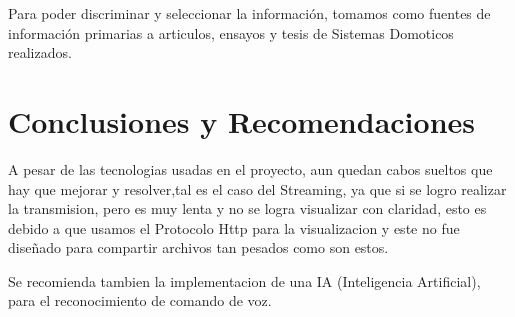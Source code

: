 \documentclass[letterpaper,12pt]{article}
\begin{document}
{Para poder discriminar y seleccionar la información, tomamos como fuentes de información primarias a articulos, ensayos y tesis de Sistemas Domoticos realizados.


\section{Conclusiones y Recomendaciones}
A pesar de las tecnologias usadas en el proyecto, aun quedan cabos sueltos que hay que mejorar y resolver,tal es el caso del Streaming, ya que si se logro realizar la transmision, pero es muy lenta y no se logra visualizar con claridad, esto es debido a que usamos el Protocolo Http para la visualizacion y este no fue diseñado para compartir archivos tan pesados como son estos.

Se recomienda tambien la implementacion de una IA (Inteligencia Artificial), para el reconocimiento de comando de voz. 


	
	
	
	
	
}
\end{document}
